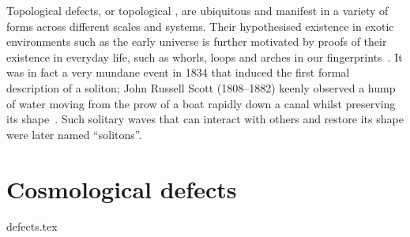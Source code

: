 %
%
%
Topological defects, or topological , are ubiquitous and manifest in a variety of forms across different scales and systems. Their hypothesised existence in exotic environments such as the early universe is further motivated by proofs of their existence in everyday life, such as whorls, loops and arches in our fingerprints~\citep{fumeronIntroductionTopologicalDefects2023}. %
It was in fact a very mundane event in 1834 that induced the first formal description of a {soliton}; John Russell Scott (1808--1882) keenly observed a hump of water moving from the prow of a boat rapidly down a canal whilst preserving its shape~\citep{vachaspatiKinksDomainWalls2006}. Such solitary waves that can interact with others and restore its shape were later named ``solitons''.























\section{Cosmological defects}\label{sec:cosmo:defects}
{{defects.tex}}


